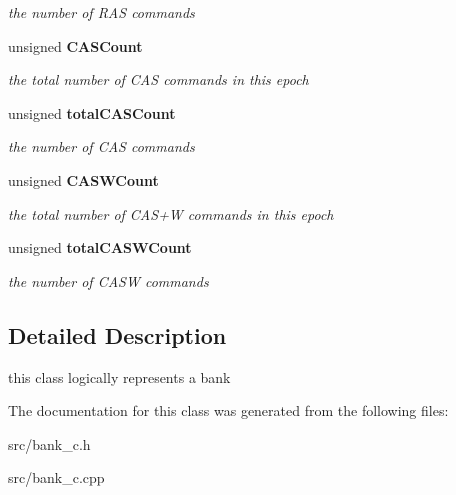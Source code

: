\begin{CompactItemize}
\begin{CompactList}\small\item\em the number of RAS commands \item\end{CompactList}\item 
unsigned {\bf CASCount}\label{class_d_r_a_m_sim_i_i_1_1bank__c_313c209ac61e10154d8fa60dbe8650fa}

\begin{CompactList}\small\item\em the total number of CAS commands in this epoch \item\end{CompactList}\item 
unsigned {\bf totalCASCount}\label{class_d_r_a_m_sim_i_i_1_1bank__c_98c5962ec017babd25e403cb7d54f204}

\begin{CompactList}\small\item\em the number of CAS commands \item\end{CompactList}\item 
unsigned {\bf CASWCount}\label{class_d_r_a_m_sim_i_i_1_1bank__c_fc4780c63805008c1962c06622faa4b1}

\begin{CompactList}\small\item\em the total number of CAS+W commands in this epoch \item\end{CompactList}\item 
unsigned {\bf totalCASWCount}\label{class_d_r_a_m_sim_i_i_1_1bank__c_7d92b79b380c0038b311e0fdc99ced0c}

\begin{CompactList}\small\item\em the number of CASW commands \item\end{CompactList}\end{CompactItemize}


\subsection{Detailed Description}
this class logically represents a bank 

The documentation for this class was generated from the following files:\begin{CompactItemize}
\item 
src/bank\_\-c.h\item 
src/bank\_\-c.cpp\end{CompactItemize}

